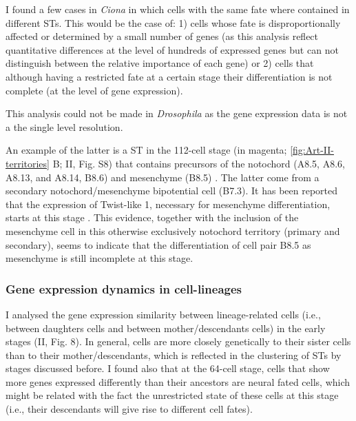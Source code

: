 

I found a few cases in \textit{Ciona} in which cells with the same fate where contained in different STs. This would be the case of: 1) cells whose fate is disproportionally affected or determined by a small number of genes (as this analysis reflect quantitative differences at the level of hundreds of expressed genes but can not distinguish between the relative importance of each gene) or 2) cells that although having a restricted fate at a certain stage their differentiation is not complete (at the level of gene expression).

This analysis could not be made in \textit{Drosophila} as the gene expression data is not a the single level resolution.

An example of the latter is a ST in the 112-cell stage (in magenta; \ref{fig:Art-II-territories} B; II, Fig. S8) that contains precursors of the notochord (A8.5, A8.6, A8.13, and A8.14, B8.6) and mesenchyme (B8.5) \citep{Tokuoka2004}.
The latter come from a secondary notochord/mesenchyme bipotential cell (B7.3). It has been reported that the expression of Twist-like 1, necessary for mesenchyme differentiation, starts at this stage \citep{Imai2003}.
This evidence, together with the inclusion of the mesenchyme cell in this otherwise exclusively notochord territory (primary and secondary), seems to indicate that the differentiation of cell pair B8.5 as mesenchyme is still incomplete at this stage.

\subsubsection{Gene expression dynamics in cell-lineages}

I analysed the gene expression similarity between lineage-related cells (i.e., between daughters cells and between mother/descendants cells) in the early stages (II, Fig. 8).
In general, cells are more closely genetically to their sister cells than to their mother/descendants, which is reflected in the clustering of STs by stages discussed before.
I found also that at the 64-cell stage, cells that show more genes expressed differently than
their ancestors are neural fated cells, which might be related with the fact the unrestricted state of these cells at this stage (i.e., their descendants will give rise to different cell fates).